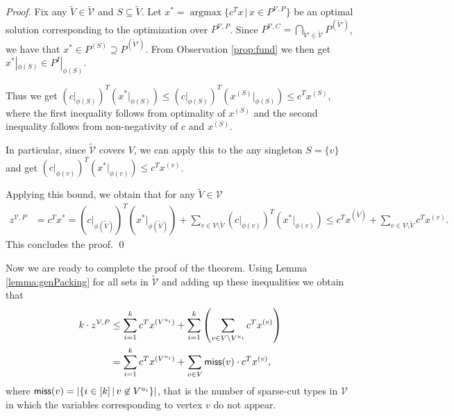 \documentclass[smallextended]{svjour3}
\begin{document}
	\begin{proof}
 Fix any $\tilde{V} \in \tilde{\mathcal{V}}$ and $S \subseteq \tilde{V}$. Let $x^* = \operatorname{argmax} \{ c^T x \,|\, x \in P^{\mathcal{V}, P}\}$ be an optimal solution corresponding to the optimization over $P^{\mathcal{V}, P}$. Since $P^{{\mathcal{V}},C} = \bigcap_{\tilde{V}' \in \tilde{\mathcal{V}}} P^{(\tilde{V}')}$, we have that $x^* \in P^{(S)} \supseteq P^{(\tilde{V}')}$. From Observation \ref{prop:fund} we then get $x^*|_{\phi(S)} \in P^I|_{\phi(S)}$. 
 
Thus we get $(c|_{\phi(S)})^T (x^*|_{\phi(S)}) \le (c|_{\phi(S)})^T (x^{(S)}|_{\phi(S)}) \leq c^T x^{(S)}$, where the first inequality follows from optimality of $x^{(S)}$ and the second inequality follows from non-negativity of $c$ and $x^{(S)}$. 

In particular, since $\tilde{\mathcal{V}}$ covers $V$, we can apply this to the any singleton $S = \{v\}$ and get $(c|_{\phi(v)})^T (x^*|_{\phi(v)}) \le c^T x^{(v)}$.
 
 Applying this bound, we obtain that for any $\tilde{V} \in {\mathcal{V}}$
	\begin{align*}
		z^{\mathcal{V}, P} &= c^T x^* = (c|_{\phi(\tilde{V})})^T (x^*|_{\phi(\tilde{V})}) + \sum_{v \in V \setminus \tilde{V}} (c|_{\phi(v)})^T (x^*|_{\phi(v)}) \le c^T x^{(\tilde{V})} + \sum_{v \in V \setminus \tilde{V}} c^T x^{(v)}.
	\end{align*}
	This concludes the proof. {
\ifmp
	\hfill \qed
\fi
}
	\end{proof}
	
Now we are ready to complete the proof of the theorem. Using Lemma \ref{lemma:genPacking} for all sets in $\tilde{\mathcal{V}}$ and adding up these inequalities we obtain that
	\begin{align}
		k \cdot z^{\mathcal{V}, P} &\leq \sum_{i = 1}^k c^T x^{(V^{u_i})} + \sum_{i = 1}^k \left(\sum_{v \in V \setminus V^{u_i}} c^T x^{(v)} \right) \notag \\
		\label{eq:oneside} &= \sum_{i = 1}^k c^T x^{(V^{u_i})} + \sum_{v \in V} {{\sf miss}}(v) \cdot c^T x^{(v)},
	\end{align}
	where ${{\sf miss}}(v) = |\{i \in [k]\,|\, v \not \in V^{u_i}\}|$, that is the number of sparse-cut types in ${\mathcal{V}}$ in which the variables corresponding to vertex $v$ do not appear.
	
\end{document}
